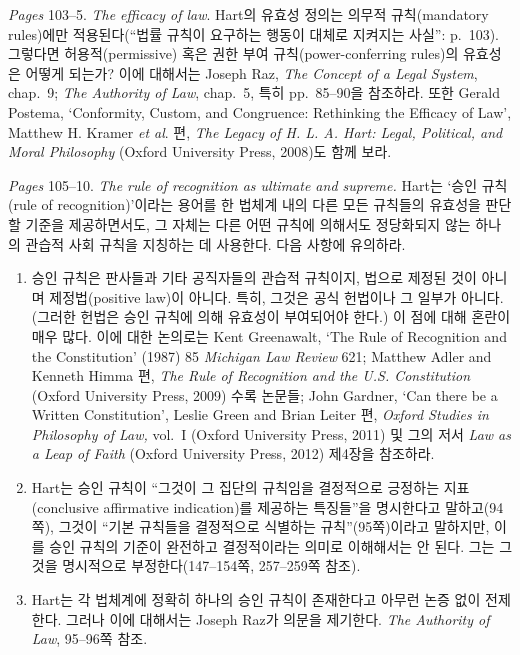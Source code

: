 {\emph{Pages} 103--5. \emph{The efficacy of law}. Hart의 유효성 정의는
의무적 규칙(mandatory rules)에만 적용된다(``법률 규칙이 요구하는 행동이
대체로 지켜지는 사실'': p.~103). 그렇다면 허용적(permissive) 혹은 권한
부여 규칙(power-conferring rules)의 유효성은 어떻게 되는가? 이에
대해서는 Joseph Raz, \emph{The Concept of a Legal System}, chap.~9;
\emph{The Authority of Law}, chap.~5, 특히 pp.~85--90을 참조하라. 또한
Gerald Postema, `Conformity, Custom, and Congruence: Rethinking the
Efficacy of Law', Matthew H. Kramer \emph{et al}. 편, \emph{The Legacy
of H. L. A. Hart: Legal, Political, and Moral Philosophy} (Oxford
University Press, 2008)도 함께 보라.

\emph{Pages} 105--10. \emph{The rule of recognition as ultimate and
supreme.} Hart는 `승인 규칙(rule of recognition)'이라는 용어를 한 법체계
내의 다른 모든 규칙들의 유효성을 판단할 기준을 제공하면서도, 그 자체는
다른 어떤 규칙에 의해서도 정당화되지 않는 하나의 관습적 사회 규칙을
지칭하는 데 사용한다. 다음 사항에 유의하라.

\begin{enumerate}
\def\labelenumi{(\arabic{enumi})}
\item
  승인 규칙은 판사들과 기타 공직자들의 관습적 규칙이지, 법으로 제정된
  것이 아니며 제정법(positive law)이 아니다. 특히, 그것은 공식 헌법이나
  그 일부가 아니다. (그러한 헌법은  승인 규칙에 의해
  유효성이 부여되어야 한다.) 이 점에 대해 혼란이 매우 많다. 이에 대한
  논의로는 Kent Greenawalt, `The Rule of Recognition and the
  Constitution' (1987) 85 \emph{Michigan Law Review} 621; Matthew Adler
  and Kenneth Himma 편, \emph{The Rule of Recognition and the U.S.
  Constitution} (Oxford University Press, 2009) 수록 논문들; John
  Gardner, `Can there be a Written Constitution', Leslie Green and Brian
  Leiter 편, \emph{Oxford Studies in Philosophy of Law,} vol.~I (Oxford
  University Press, 2011) 및 그의 저서 \emph{Law as a Leap of Faith}
  (Oxford University Press, 2012) 제4장을 참조하라.
\item
  Hart는 승인 규칙이 ``그것이 그 집단의 규칙임을 결정적으로 긍정하는
  지표(conclusive affirmative indication)를 제공하는 특징들''을
  명시한다고 말하고(94쪽), 그것이 ``기본 규칙들을 결정적으로 식별하는
  규칙''(95쪽)이라고 말하지만, 이를 승인 규칙의 기준이 완전하고
  결정적이라는 의미로 이해해서는 안 된다. 그는 그것을 명시적으로
  부정한다(147--154쪽, 257--259쪽 참조).
\item
  Hart는 각 법체계에 정확히 하나의 승인 규칙이 존재한다고 아무런 논증
  없이 전제한다. 그러나 이에 대해서는 Joseph Raz가 의문을 제기한다.
  \emph{The Authority of Law}, 95--96쪽 참조.
\end{enumerate}

}
